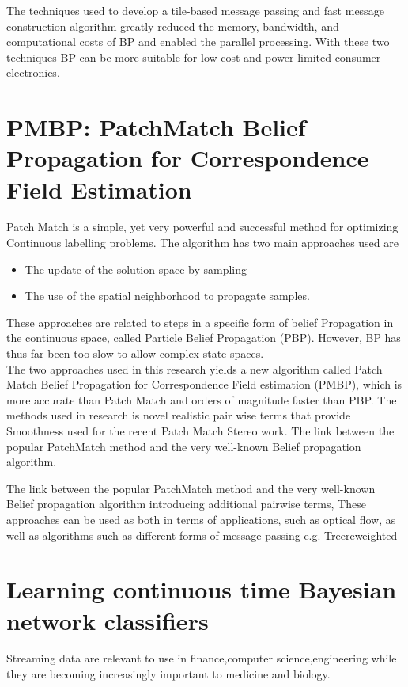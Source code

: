  The techniques used to develop a tile-based message passing and fast message construction  algorithm greatly reduced the memory, bandwidth, and computational costs of BP and enabled the parallel processing. With these two techniques  BP  can be  more suitable for low-cost and power limited consumer electronics.

\section{PMBP: PatchMatch Belief Propagation for Correspondence Field Estimation}
Patch Match is a simple, yet very powerful and successful method for optimizing Continuous labelling problems.
The algorithm has two main approaches  used are
\begin{itemize}
  \item The update of the solution space by sampling
  \item The use of the spatial neighborhood to propagate samples.
\end{itemize}
These approaches are related to steps in a specific form of belief Propagation in the continuous space, called Particle Belief Propagation (PBP). However, BP has thus far been too slow to allow complex state spaces.\\The two approaches used in this research yields a new algorithm called
Patch Match Belief Propagation for Correspondence Field estimation (PMBP), which is more accurate than Patch Match and orders of magnitude faster than PBP.
The methods used in research is novel realistic pair wise terms that provide Smoothness used for the recent Patch Match Stereo work.
The link between the popular PatchMatch method and the very well-known Belief propagation algorithm.

The link between the popular PatchMatch method and the very well-known Belief propagation algorithm  introducing additional pairwise terms, These approaches  can be  used as both in terms of applications, such as optical flow, as well as algorithms such as different forms of message passing e.g.  Treereweighted


\section{Learning continuous time Bayesian network classifiers}
Streaming data are relevant to use in finance,computer science,engineering while  they are becoming increasingly important to medicine and biology.


